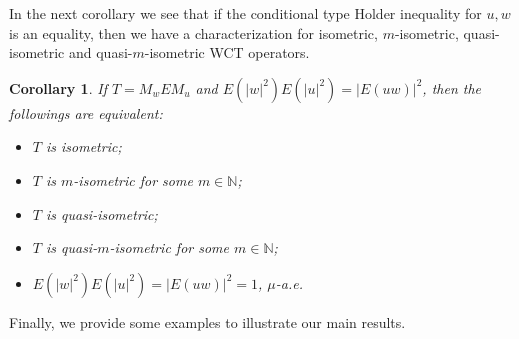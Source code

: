 \documentclass{amsart}
\newtheorem{cor}[thm]{Corollary}
\theoremstyle{definition}\newtheorem{defn}[thm]{Definition}
\theoremstyle{remark}
\numberwithin{equation}{section}
\begin{document}
In the next corollary we see that if the conditional type Holder inequality for $u,w$ is an equality, then we have a characterization for isometric, $m$-isometric, quasi-isometric and quasi-$m$-isometric WCT operators.  
\begin{cor}\label{c2.6}
 If $T=M_wEM_u$ and $E(|w|^2)E(|u|^2)=|E(uw)|^2$, then the followings are equivalent:
 \begin{itemize}
 \item  $T$ is isometric;
 
 \item $T$ is $m$-isometric for some $m\in \mathbb{N}$;
 
 \item $T$ is quasi-isometric;
 
 \item $T$ is quasi-$m$-isometric for some $m\in \mathbb{N}$;
 
 \item $E(|w|^2)E(|u|^2)=|E(uw)|^2=1$, $\mu$-a.e.
 \end{itemize}
\end{cor}

Finally, we provide some examples to illustrate our main results.
\end{document}
